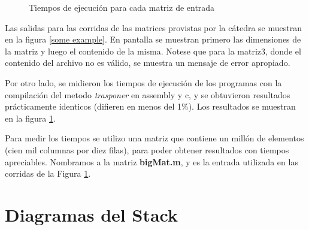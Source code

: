 \documentclass[11pt,a4paper]{article}
\begin{document}
\begin{figure}
\begin{center}
\end{center}
\caption{Tiempos de ejecuci\'on para cada matriz de entrada}
\label{some example 2}
\end{figure}

Las salidas para las corridas de las matrices provistas por la c\'atedra se muestran en la figura \ref{some example}. En pantalla se muestran primero las dimensiones de la matriz y luego el contenido de la misma. Notese que para la matriz3, donde el contenido del archivo no es v\'alido, se muestra un mensaje de error apropiado.

Por otro lado, se midieron los tiempos de ejecuci\'on de los programas con la compilaci\'on del metodo \textit{trasponer} en assembly y c, y se obtuvieron resultados pr\'acticamente identicos (difieren en menos del 1\%). Los resultados se muestran en la figura \ref{some example 2}.

Para medir los tiempos se utilizo una matriz que contiene un mill\'on de elementos (cien mil columnas por diez filas), para poder obtener resultados con tiempos apreciables. Nombramos a la matriz \textbf{bigMat.m}, y es la entrada utilizada en las corridas de la Figura \ref{some example 2}.

\section{Diagramas del Stack}
\end{document}
